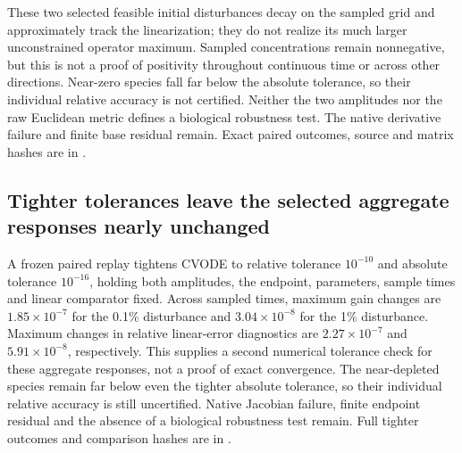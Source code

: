 These two selected feasible initial disturbances decay on the sampled grid and approximately track the linearization; they do not realize its much larger unconstrained operator maximum. Sampled concentrations remain nonnegative, but this is not a proof of positivity throughout continuous time or across other directions. Near-zero species fall far below the absolute tolerance, so their individual relative accuracy is not certified. Neither the two amplitudes nor the raw Euclidean metric defines a biological robustness test. The native derivative failure and finite base residual remain. Exact paired outcomes, source and matrix hashes are in .

\subsection{Tighter tolerances leave the selected aggregate responses nearly unchanged}
A frozen paired replay tightens CVODE to relative tolerance $10^{-10}$ and absolute tolerance $10^{-16}$, holding both amplitudes, the endpoint, parameters, sample times and linear comparator fixed. Across sampled times, maximum gain changes are $1.85\times10^{-7}$ for the 0.1\% disturbance and $3.04\times10^{-8}$ for the 1\% disturbance. Maximum changes in relative linear-error diagnostics are $2.27\times10^{-7}$ and $5.91\times10^{-8}$, respectively. This supplies a second numerical tolerance check for these aggregate responses, not a proof of exact convergence. The near-depleted species remain far below even the tighter absolute tolerance, so their individual relative accuracy is still uncertified. Native Jacobian failure, finite endpoint residual and the absence of a biological robustness test remain. Full tighter outcomes and comparison hashes are in .
